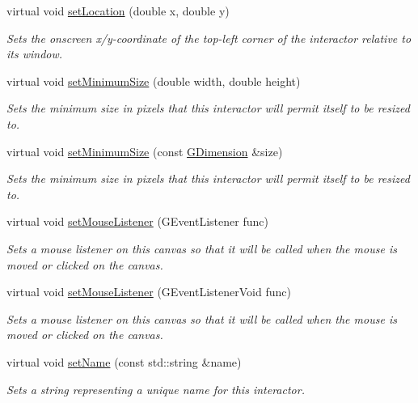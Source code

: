 \begin{DoxyCompactItemize}
virtual void \mbox{\hyperlink{classGInteractor_a04594e8ba9b98513a64f1da00dcae18c}{set\+Location}} (double x, double y)
\begin{DoxyCompactList}\small\item\em Sets the onscreen x/y-\/coordinate of the top-\/left corner of the interactor relative to its window. \end{DoxyCompactList}\item 
virtual void \mbox{\hyperlink{classGInteractor_a0cf428e207b7f22cc08138a90b1b87b2}{set\+Minimum\+Size}} (double width, double height)
\begin{DoxyCompactList}\small\item\em Sets the minimum size in pixels that this interactor will permit itself to be resized to. \end{DoxyCompactList}\item 
virtual void \mbox{\hyperlink{classGInteractor_a3b1046117ac6cb7abe467e00ba8a81f4}{set\+Minimum\+Size}} (const \mbox{\hyperlink{classGDimension}{G\+Dimension}} \&size)
\begin{DoxyCompactList}\small\item\em Sets the minimum size in pixels that this interactor will permit itself to be resized to. \end{DoxyCompactList}\item 
virtual void \mbox{\hyperlink{classGCanvas_a37d8dbc943f59920f705b0104f60bde2}{set\+Mouse\+Listener}} (G\+Event\+Listener func)
\begin{DoxyCompactList}\small\item\em Sets a mouse listener on this canvas so that it will be called when the mouse is moved or clicked on the canvas. \end{DoxyCompactList}\item 
virtual void \mbox{\hyperlink{classGCanvas_aea7f647ea62d59f71b5fad6aa65eeaf9}{set\+Mouse\+Listener}} (G\+Event\+Listener\+Void func)
\begin{DoxyCompactList}\small\item\em Sets a mouse listener on this canvas so that it will be called when the mouse is moved or clicked on the canvas. \end{DoxyCompactList}\item 
virtual void \mbox{\hyperlink{classGInteractor_a9d3a2685df23b5e7cbf59c19c4a1f9b5}{set\+Name}} (const std\+::string \&name)
\begin{DoxyCompactList}\small\item\em Sets a string representing a unique name for this interactor. \end{DoxyCompactList}\item 

\end{DoxyCompactItemize}
